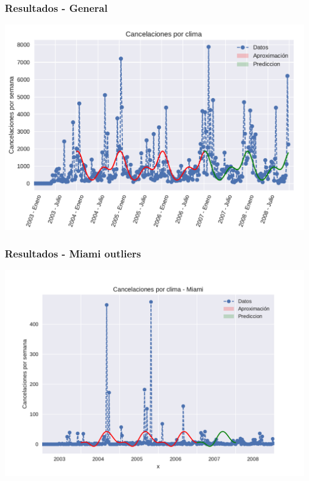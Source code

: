 \documentclass{beamer}
\begin{document}


\begin{frame}

\frametitle{Resultados - General}


{\centering
\includegraphics[scale=0.62]{diapos/imagenes/cancelacionesPorClimaGeneralPrediccionV1.pdf}
}


\end{frame}


\begin{frame}

\frametitle{Resultados - Miami outliers}



{\centering
\includegraphics[scale=0.62]{diapos/imagenes/cancelacionesClimaMiamiPrediccionCONOUTS.pdf}
}

\end{frame}
\end{document}
